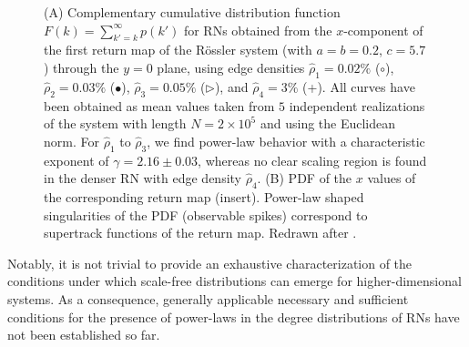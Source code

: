\documentclass[graybox]{svmult}
\begin{document}
\begin{figure}
\centering
{}
\caption{(A) Complementary cumulative distribution function $F(k)=\sum_{k'=k}^{\infty} p(k')$ for RNs obtained from the $x$-component of the first return map of the R\"ossler system (with $a=b=0.2$, $c=5.7$) through the $y=0$ plane, using edge densities $\hat{\rho}_1 =0.02\%$ ($\circ$), $\hat{\rho}_2 =0.03\%$ ($\bullet$), $\hat{\rho}_3 =0.05\%$ ($\triangleright$), and $\hat{\rho}_4 =3\%$ (+). All curves have been obtained as mean values taken from $5$ independent realizations of the system with length $N=2\times 10^5$ and using the Euclidean norm. For $\hat{\rho}_1$ to $\hat{\rho}_3$, we find power-law behavior with a characteristic exponent of $\gamma=2.16\pm 0.03$, whereas no clear scaling region is found in the denser RN with edge density $\hat{\rho}_4$. (B) PDF of the $x$ values of the corresponding return map (insert). Power-law shaped singularities of the PDF (observable spikes) correspond to supertrack functions \cite{marwan2002herz,Oblow1988,Ott1993} of the return map. Redrawn after \cite{Zou2012EPL}.}
\label{fig:roessler_scaling}
\end{figure}

Notably, it is not trivial to provide an exhaustive characterization of the conditions under which scale-free distributions can emerge for higher-dimensional systems. As a consequence, generally applicable necessary and sufficient conditions for the presence of power-laws in the degree distributions of RNs have not been established so far.
\end{document}
